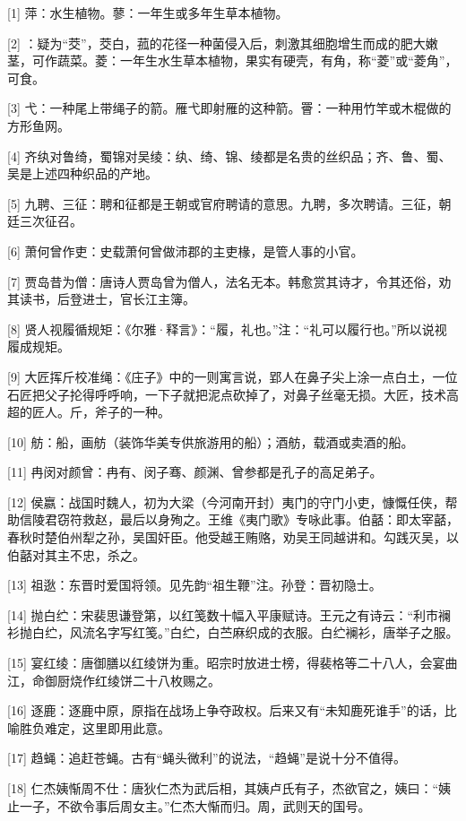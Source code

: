 \documentclass[12pt,UTF8]{ctexbook}
\begin{document}
[1] 萍：水生植物。蓼：一年生或多年生草本植物。

[2] ：疑为“茭”，茭白，菰的花径一种菌侵入后，刺激其细胞增生而成的肥大嫩茎，可作蔬菜。菱：一年生水生草本植物，果实有硬壳，有角，称“菱”或“菱角”，可食。

[3] 弋：一种尾上带绳子的箭。雁弋即射雁的这种箭。罾：一种用竹竿或木棍做的方形鱼网。

[4] 齐纨对鲁绮，蜀锦对吴绫：纨、绮、锦、绫都是名贵的丝织品；齐、鲁、蜀、吴是上述四种织品的产地。

[5] 九聘、三征：聘和征都是王朝或官府聘请的意思。九聘，多次聘请。三征，朝廷三次征召。

[6] 萧何曾作吏：史载萧何曾做沛郡的主吏椽，是管人事的小官。

[7] 贾岛昔为僧：唐诗人贾岛曾为僧人，法名无本。韩愈赏其诗才，令其还俗，劝其读书，后登进士，官长江主簿。

[8] 贤人视履循规矩：《尔雅·释言》：“履，礼也。”注：“礼可以履行也。”所以说视履成规矩。

[9] 大匠挥斤校准绳：《庄子》中的一则寓言说，郢人在鼻子尖上涂一点白土，一位石匠把父子抡得呼呼响，一下子就把泥点砍掉了，对鼻子丝毫无损。大匠，技术高超的匠人。斤，斧子的一种。

[10] 舫：船，画舫（装饰华美专供旅游用的船）；酒舫，载酒或卖酒的船。

[11] 冉闵对颜曾：冉有、闵子骞、颜渊、曾参都是孔子的高足弟子。

[12] 侯嬴：战国时魏人，初为大梁（今河南开封）夷门的守门小吏，慷慨任侠，帮助信陵君窃符救赵，最后以身殉之。王维《夷门歌》专咏此事。伯嚭：即太宰嚭，春秋时楚伯州犁之孙，吴国奸臣。他受越王贿赂，劝吴王同越讲和。勾践灭吴，以伯嚭对其主不忠，杀之。

[13] 祖逖：东晋时爱国将领。见先韵“祖生鞭”注。孙登：晋初隐士。

[14] 抛白纻：宋裴思谦登第，以红笺数十幅入平康赋诗。王元之有诗云：“利市襕衫抛白纻，风流名字写红笺。”白纻，白苎麻织成的衣服。白纻襕衫，唐举子之服。

[15] 宴红绫：唐御膳以红绫饼为重。昭宗时放进士榜，得裴格等二十八人，会宴曲江，命御厨烧作红绫饼二十八枚赐之。

[16] 逐鹿：逐鹿中原，原指在战场上争夺政权。后来又有“未知鹿死谁手”的话，比喻胜负难定，这里即用此意。

[17] 趋蝇：追赶苍蝇。古有“蝇头微利”的说法，“趋蝇”是说十分不值得。

[18] 仁杰姨惭周不仕：唐狄仁杰为武后相，其姨卢氏有子，杰欲官之，姨曰：“姨止一子，不欲令事后周女主。”仁杰大惭而归。周，武则天的国号。
\end{document}
